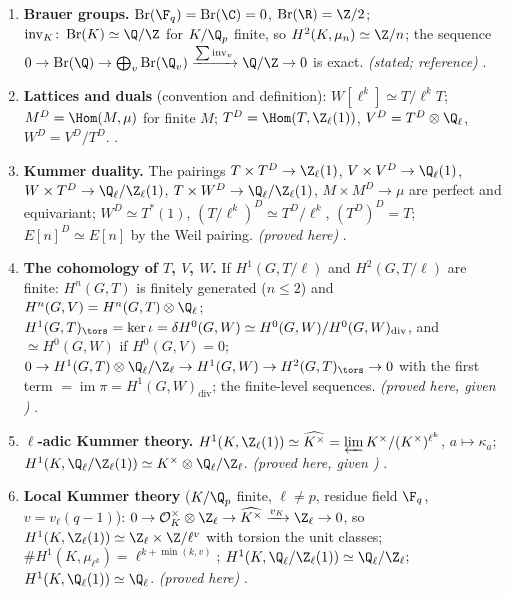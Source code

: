 \begin{sloppypar}
\begin{enumerate}[label=\textbf{\thechapter.\arabic*}]
.
\item \textbf{Brauer groups.} $\operatorname{Br}(\F_q)=\operatorname{Br}(\C)=0$, $\operatorname{Br}(\R)=\Z/2$; $\operatorname{inv}_K\colon\operatorname{Br}(K)\simeq\Q/\Z$ for $K/\Q_p$ finite, so $H^2(K,\mu_n)\simeq\Z/n$; the sequence
$0\to\operatorname{Br}(\Q)\to\bigoplus_v\operatorname{Br}(\Q_v)\xrightarrow{\sum\operatorname{inv}_v}\Q/\Z\to0$ is exact. \emph{(stated; reference)} .
\item \textbf{Lattices and duals} (convention and definition): $W[\ell^k]\simeq T/\ell^kT$; $M^D=\Hom(M,\mu)$ for finite $M$; $T^D=\Hom(T,\Z_\ell(1))$, $V^D=T^D\otimes\Q_\ell$, $W^D=V^D/T^D$.
.
\item \textbf{Kummer duality.} The pairings $T\times T^D\to\Z_\ell(1)$, $V\times V^D\to\Q_\ell(1)$, $W\times T^D\to\Q_\ell/\Z_\ell(1)$, $T\times W^D\to\Q_\ell/\Z_\ell(1)$, $M\times M^D\to\mu$ are perfect and
equivariant; $W^D\simeq T^*(1)$, $(T/\ell^k)^D\simeq T^D/\ell^k$, $(T^D)^D=T$; $E[n]^D\simeq E[n]$ by the Weil pairing. \emph{(proved here)} .
\item \textbf{The cohomology of $T$, $V$, $W$.} If $H^1(G,T/\ell)$ and $H^2(G,T/\ell)$ are finite: $H^n(G,T)$ is finitely generated ($n\le2$) and $H^n(G,V)=H^n(G,T)\otimes\Q_\ell$;
$H^1(G,T)_{\tors}=\ker\iota=\delta H^0(G,W)\simeq H^0(G,W)/H^0(G,W)_{\mathrm{div}}$, and $\simeq H^0(G,W)$ if $H^0(G,V)=0$;
$0\to H^1(G,T)\otimes\Q_\ell/\Z_\ell\to H^1(G,W)\to H^2(G,T)_{\tors}\to0$ with the first term $=\operatorname{im}\pi=H^1(G,W)_{\mathrm{div}}$; the finite-level sequences.
\emph{(proved here, given )} .
\item \textbf{$\ell$-adic Kummer theory.} $H^1(K,\Z_\ell(1))\simeq\widehat{K^\times}=\varprojlim K^\times/(K^\times)^{\ell^k}$, $a\mapsto\kappa_a$; $H^1(K,\Q_\ell/\Z_\ell(1))\simeq K^\times\otimes\Q_\ell/\Z_\ell$.
\emph{(proved here, given )} .
\item \textbf{Local Kummer theory} ($K/\Q_p$ finite, $\ell\ne p$, residue field $\F_q$, $v=v_\ell(q-1)$): $0\to\mathcal O_K^\times\otimes\Z_\ell\to\widehat{K^\times}\xrightarrow{v_K}\Z_\ell\to0$, so
$H^1(K,\Z_\ell(1))\simeq\Z_\ell\times\Z/\ell^v$ with torsion the unit classes; $\#H^1(K,\mu_{\ell^k})=\ell^{k+\min(k,v)}$; $H^1(K,\Q_\ell/\Z_\ell(1))\simeq\Q_\ell/\Z_\ell$; $H^1(K,\Q_\ell(1))\simeq\Q_\ell$.
\emph{(proved here)} .

\end{enumerate}
\end{sloppypar}
